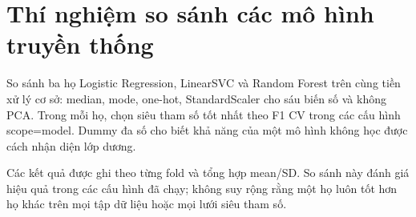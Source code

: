 \section{Thí nghiệm so sánh các mô hình truyền thống}
\label{sec:5_4}
So sánh ba họ Logistic Regression, LinearSVC và Random Forest trên cùng tiền xử lý cơ sở: median, mode, one-hot, StandardScaler cho sáu biến số và không PCA. Trong mỗi họ, chọn siêu tham số tốt nhất theo F1 CV trong các cấu hình scope=model. Dummy đa số cho biết khả năng của một mô hình không học được cách nhận diện lớp dương.

Các kết quả được ghi theo từng fold và tổng hợp mean/SD. So sánh này đánh giá hiệu quả trong các cấu hình đã chạy; không suy rộng rằng một họ luôn tốt hơn họ khác trên mọi tập dữ liệu hoặc mọi lưới siêu tham số.
